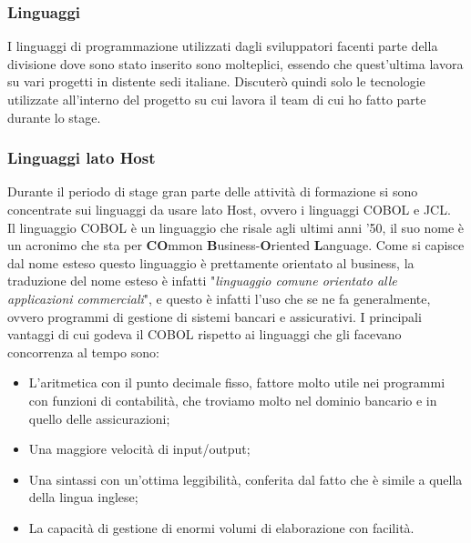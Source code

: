 	\subsubsection{Linguaggi}
	
	I linguaggi di programmazione utilizzati dagli sviluppatori facenti parte della divisione dove sono stato inserito sono molteplici, essendo che quest'ultima lavora su vari progetti in distente sedi italiane. Discuterò quindi solo le tecnologie utilizzate all'interno del progetto su cui lavora il team di cui ho fatto parte durante lo stage.
		
	\subsubsection{Linguaggi lato Host}
	Durante il periodo di stage gran parte delle attività di formazione si sono concentrate sui linguaggi da usare lato Host, ovvero i linguaggi COBOL e JCL.\\
	
	Il linguaggio COBOL è un linguaggio che risale agli ultimi anni '50, il suo nome è un acronimo che sta per \textbf{CO}mmon \textbf{B}usiness-\textbf{O}riented \textbf{L}anguage. Come si capisce dal nome esteso questo linguaggio è prettamente orientato al business, la traduzione del nome esteso è infatti "\textit{linguaggio comune orientato alle applicazioni commerciali}", e questo è infatti l'uso che se ne fa generalmente, ovvero programmi di gestione di sistemi bancari e assicurativi.
	I principali vantaggi di cui godeva il COBOL rispetto ai linguaggi che gli facevano concorrenza al tempo sono: 
	\begin{itemize}
		\item L'aritmetica con il punto decimale fisso, fattore molto utile nei programmi con funzioni di contabilità, che troviamo molto nel dominio bancario e in quello delle assicurazioni;
		\item Una maggiore velocità di input/output;
		\item Una sintassi con un'ottima leggibilità, conferita dal fatto che è simile a quella della lingua inglese;
		\item La capacità di gestione di enormi volumi di elaborazione con facilità.
	\end{itemize}		

